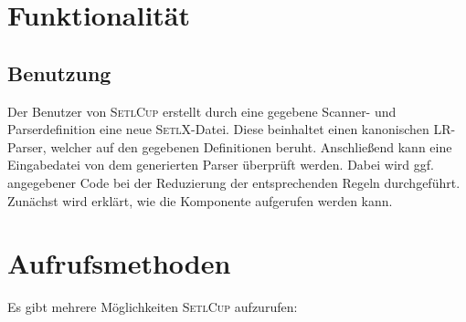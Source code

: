 \section{Funktionalität}
\subsection{Benutzung}
Der Benutzer von \textsc{SetlCup} erstellt durch eine gegebene Scanner- und Parserdefinition eine neue \textsc{SetlX}-Datei. Diese beinhaltet einen kanonischen LR-Parser, welcher auf den gegebenen Definitionen beruht. Anschließend kann eine Eingabedatei von dem generierten Parser überprüft werden. Dabei wird ggf. angegebener Code bei der Reduzierung der entsprechenden Regeln durchgeführt. 
Zunächst wird erklärt, wie die Komponente aufgerufen werden kann.
\section{Aufrufsmethoden}
Es gibt mehrere Möglichkeiten \textsc{SetlCup} aufzurufen:
